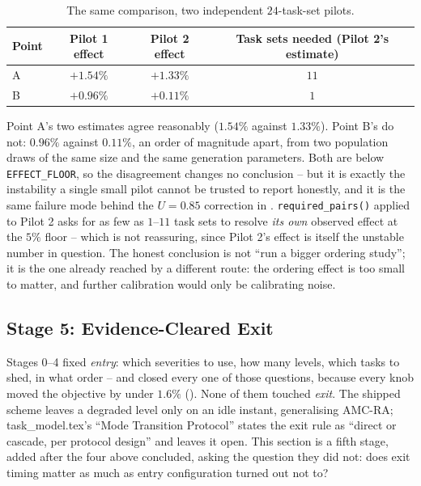 \documentclass{article}
\begin{document}
\begin{table}[h]
\centering
\caption{The same comparison, two independent $24$-task-set pilots.}
\label{tab:pilot-variance}
\begin{tabular}{lccc}
\toprule
Point & Pilot 1 effect & Pilot 2 effect & Task sets needed (Pilot 2's estimate) \\
\midrule
A & $+1.54\%$ & $+1.33\%$ & $11$ \\
B & $+0.96\%$ & $+0.11\%$ & $1$ \\
\bottomrule
\end{tabular}
\end{table}

\noindent Point A's two estimates agree reasonably ($1.54\%$ against $1.33\%$).
Point B's do not: $0.96\%$ against $0.11\%$, an order of magnitude apart, from
two population draws of the same size and the same generation parameters. Both
are below \texttt{EFFECT\_FLOOR}, so the disagreement changes no conclusion --
but it is exactly the instability a single small pilot cannot be trusted to
report honestly, and it is the same failure mode behind the $U=0.85$ correction
in . \texttt{required\_pairs()} applied to Pilot
2 asks for as few as $1$--$11$ task sets to resolve \emph{its own} observed
effect at the $5\%$ floor -- which is not reassuring, since Pilot 2's effect is
itself the unstable number in question. The honest conclusion is not ``run a
bigger ordering study''; it is the one  already
reached by a different route: the ordering effect is too small to matter, and
further calibration would only be calibrating noise.

\subsection{Stage 5: Evidence-Cleared Exit}
\label{sec:exit-results}

Stages 0--4 fixed \emph{entry}: which severities to use, how many levels, which
tasks to shed, in what order -- and closed every one of those questions,
because every knob moved the objective by under $1.6\%$
(). None of them touched \emph{exit}. The shipped
scheme leaves a degraded level only on an idle instant, generalising AMC-RA;
task\_model.tex's ``Mode Transition Protocol'' states the exit rule as
``direct or cascade, per protocol design'' and leaves it open. This section is
a fifth stage, added after the four above concluded, asking the question they
did not: does exit timing matter as much as entry configuration turned out not
to?
\end{document}
